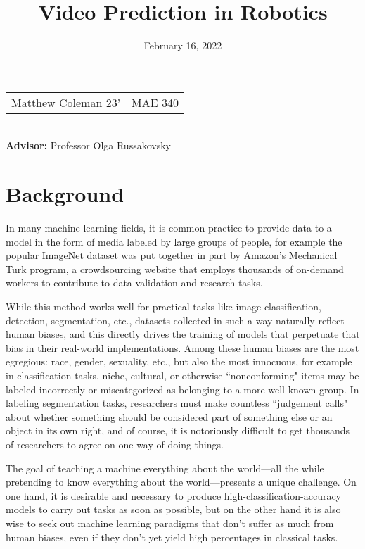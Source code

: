 \documentclass[10pt, letterpaper]{article}
\title{\vspace{-2em}
	Video Prediction in Robotics
\vspace{-2em}}
\date{February 16, 2022}
\begin{document}
\maketitle
\begin{center}
	\begin{tabular}{ c c }
		Matthew Coleman 23' & MAE 340
	\end{tabular} \\
	\textbf{Advisor:} Professor Olga Russakovsky
\end{center}

\section{Background}

In many machine learning fields, it is common practice to provide data to a
model in the form of media labeled by large groups of people, for example the
popular ImageNet dataset was put together in part by Amazon's Mechanical Turk
program, a crowdsourcing website that employs thousands of on-demand workers to
contribute to data validation and research tasks. \cite{imagenet}

While this method works well for practical tasks like image classification,
detection, segmentation, etc., datasets collected in such a way naturally
reflect human biases, and this directly drives the training of models that
perpetuate that bias in their real-world implementations. \cite{olga_biases}
Among these human biases are the most egregious: race, gender, sexuality, etc.,
but also the most innocuous, for example in classification tasks, niche,
cultural, or otherwise ``nonconforming" items may be labeled incorrectly or
miscategorized as belonging to a more well-known group. In labeling
segmentation tasks, researchers must make countless ``judgement calls" about
whether something should be considered part of something else or an object in
its own right, and of course, it is notoriously difficult to get thousands of
researchers to agree on one way of doing things. \cite{labeling_disagreement}

The goal of teaching a machine everything about the world---all the while
pretending to know everything about the world---presents a unique challenge. On
one hand, it is desirable and necessary to produce high-classification-accuracy
models to carry out tasks as soon as possible, but on the other hand it is also
wise to seek out machine learning paradigms that don't suffer as much from
human biases, even if they don't yet yield high percentages in classical tasks.
\end{document}
